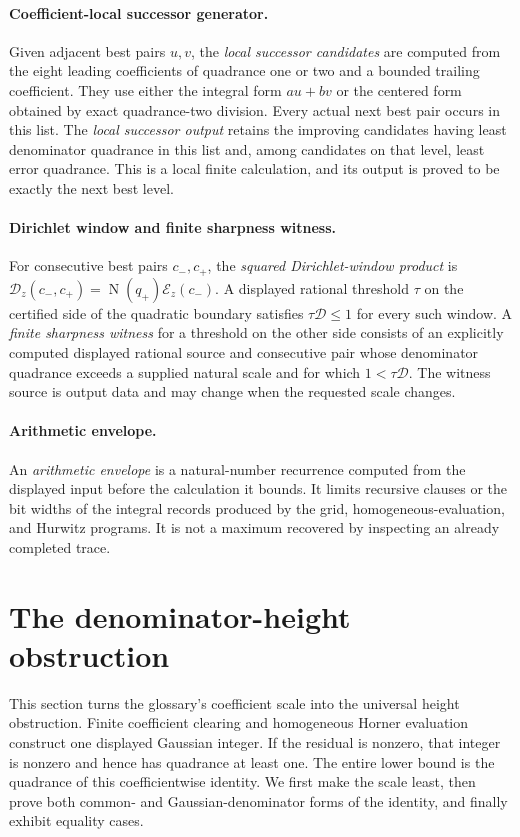 \documentclass[11pt]{article}
\newcommand{\Norm}[1]{\operatorname{N}\!\left(#1\right)}
\begin{document}
\paragraph{Coefficient-local successor generator.}
Given adjacent best pairs $u,v$, the \emph{local successor candidates} are
computed from the eight leading coefficients of quadrance one or two and a
bounded trailing coefficient.  They use either the integral form $au+bv$ or
the centered form obtained by exact quadrance-two division.  Every actual
next best pair occurs in this list.  The \emph{local successor output} retains
the improving candidates having least denominator quadrance in this list and,
among candidates on that level, least error quadrance.  This is a local finite
calculation, and its output is proved to be exactly the next best level.

\paragraph{Dirichlet window and finite sharpness witness.}
For consecutive best pairs $c_-,c_+$, the \emph{squared Dirichlet-window
product} is
$\mathcal D_z(c_-,c_+)=\Norm{q_+}\mathcal E_z(c_-)$.  A displayed rational
threshold $\tau$ on the certified side of the quadratic boundary satisfies
$\tau\mathcal D\le1$ for every such window.  A \emph{finite sharpness
witness} for a threshold on the other side consists of an explicitly
computed displayed rational source and consecutive pair whose denominator
quadrance exceeds a supplied natural scale and for which
$1<\tau\mathcal D$.  The witness source is output data and may change when
the requested scale changes.

\paragraph{Arithmetic envelope.}
An \emph{arithmetic envelope} is a natural-number recurrence computed from
the displayed input before the calculation it bounds.  It limits recursive
clauses or the bit widths of the integral records produced by the grid,
homogeneous-evaluation, and Hurwitz programs.  It is not a maximum recovered
by inspecting an already completed trace.

\section{The denominator-height obstruction}
\label{sec:lower}

This section turns the glossary's coefficient scale into the universal
height obstruction.  Finite coefficient clearing and homogeneous Horner
evaluation construct one displayed Gaussian integer.  If the residual is
nonzero, that integer is nonzero and hence has quadrance at least one.  The
entire lower bound is the quadrance of this coefficientwise identity.  We
first make the scale least, then prove both common- and Gaussian-denominator
forms of the identity, and finally exhibit equality cases.
\end{document}
